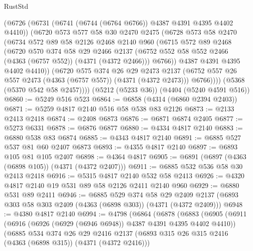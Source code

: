 \begin{lexlean}{RustStd}
\begin{coremodule}
{\begin{coremodule}
{{{{{{{{{{{{{{{{          (@6726
            (@6731 (@6741 (@6744 (@6764 @6766)) @4387 @4391 @4395 @4402 @4410))
            (@6720
              @573
              @577
              @58
              @30
              @2470
              @2475
              (@6728
                @573
                @58
                @2470
                (@6734
                  @572
                  @89
                  @58
                  @2126
                  @2468
                  @2140
                  @960
                  (@6715
                    @572
                    @89
                    @2468
                    (@6720
                      @570
                      @374
                      @58
                      @29
                      @2466
                      @2137
                      (@6752 @552 @58 @552 @2466 (@4363 (@6757 @552)) (@4371 (@4372 @2466)))
                      @6766))
                  @4387
                  @4391
                  @4395
                  @4402
                  @4410))
              (@6720
                @575
                @374
                @26
                @29
                @2473
                @2137
                (@6752 @557 @26 @557 @2473 (@4363 (@6757 @557)) (@4371 (@4372 @2473)))
                @6766))))
        (@5368 (@5370 @542 @58 @2457))))
    (@5212 (@5233 @36))
    (@4404 (@5240 @4591 @516))
@6860 := @5249 @516 @523
@6864 := @6858 (@4314 (@6860 @2394 @2403))
@6871 := @5259 @4817 @2140 @516 @58 @538 @83 @2126
@6873 := @2133 @2413 @2418
@6874 := @2408 @6873
@6876 := @6871 @6874 @2405
@6877 := @5273 @6331
@6878 := @6876 @6877
@6880 := @4334 @4817 @2140
@6883 := @6880 @538 @83 @6874
@6885 := @4343 @4817 @2140
@6891 := @6885 @527 @537 @81 @60 @2407 @6873
@6893 := @4355 @4817 @2140
@6897 := @6893 @105 @81 @105 @2407
@6898 := @4364 @4817
@6905 := @6891 (@6897 (@4363 (@6898 @105)) (@4371 (@4372 @2407)))
@6911 := @6885 @532 @536 @58 @30 @2413 @2418
@6916 := @5315 @4817 @2140 @532 @58 @2413
@6926 := @4320 @4817 @2140 @19 @531 @89 @58 @2126 @2411 @2140 @960
@6929 := @6880 @531 @89 @2411
@6946 := @6885
    @529
    @374
    @58
    @29
    @2409
    @2137
    (@6893 @303 @58 @303 @2409 (@4363 (@6898 @303)) (@4371 (@4372 @2409)))
@6948 := @4380 @4817 @2140
@6994 := @4798
    (@6864
      (@6878
        (@6883
          (@6905
            (@6911
              (@6916 (@6926 (@6929 (@6946 @6948)) @4387 @4391 @4395 @4402 @4410))
              (@6885
                @534
                @374
                @26
                @29
                @2416
                @2137
                (@6893 @315 @26 @315 @2416 (@4363 (@6898 @315)) (@4371 (@4372 @2416)))
}}}}}}}}}}}}}}}}
\end{coremodule}}
\end{coremodule}
\end{lexlean}
